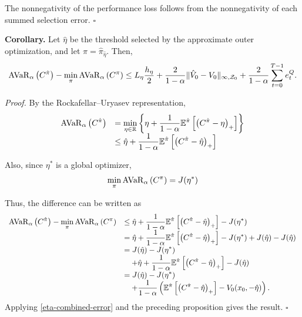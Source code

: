 The nonnegativity of the performance loss follows from the nonnegativity of each summed selection error.
\hfill$\square$

\noindent\textbf{Corollary.}
Let $\hat{\eta}$ be the threshold selected by the approximate outer optimization, and let $\hat{\pi}=\hat{\pi}_{\hat{\eta}}$.
Then,
\begin{equation}
	\operatorname{AVaR}_{\alpha} \left( C^{\hat{\pi}} \right) - \min_{\pi} \operatorname{AVaR}_{\alpha} \left( C^{\pi} \right) \leq L_{\eta}\frac{h_{\eta}}{2} + \frac{2}{1-\alpha} \| \hat{V}_0 - V_0 \|_{\infty, \mathcal{Z}_0}  + \frac{2}{1-\alpha} \sum_{t=0}^{T-1}e_t^Q.
\end{equation}

\noindent\textit{Proof.}
By the Rockafellar--Uryasev representation,
\begin{equation}
	\begin{array}{rl}
		\displaystyle \operatorname{AVaR}_{\alpha} \left( C^{\hat{\pi}} \right) &= \displaystyle \min_{\eta \in \mathbb{R}} \left\{ \eta + \frac{1}{1 - \alpha} \mathbb{E}^{\hat{\pi}} \left[ \left( C^{\hat{\pi}} - \eta \right)_+ \right] \right\} \\
		& \displaystyle \leq \hat{\eta} + \frac{1}{1-\alpha} \mathbb{E}^{\hat{\pi}} \left[ \left( C^{\hat{\pi}} - \hat{\eta} \right)_+ \right]
	\end{array}
	\notag
	\label{approx-policy-avar-bound}
\end{equation}

Also, since $\eta^*$ is a global optimizer,
\begin{equation}
	\min_{\pi} \operatorname{AVaR}_{\alpha} \left( C^{\pi} \right) = J(\eta^*)
	\notag
	\label{optimal-eta-avar}
\end{equation}

Thus, the difference can be written as
\begin{equation}
	\begin{array}{rl}
		\displaystyle \operatorname{AVaR}_{\alpha} \left( C^{\hat{\pi}} \right) - \min_{\pi} \operatorname{AVaR}_{\alpha} \left( C^{\pi} \right) & \displaystyle \leq \hat{\eta} + \frac{1}{1-\alpha} \mathbb{E}^{\hat{\pi}} \left[ \left( C^{\hat{\pi}} - \hat{\eta} \right)_+ \right] - J(\eta^*) \\
		& \displaystyle = \hat{\eta} + \frac{1}{1-\alpha} \mathbb{E}^{\hat{\pi}} \left[ \left( C^{\hat{\pi}} - \hat{\eta} \right)_+ \right] - J(\eta^*) + J(\hat{\eta}) - J(\hat{\eta}) \\
		& \displaystyle = J(\hat{\eta}) - J(\eta^*) \\
		& \displaystyle \quad + \hat{\eta} +  \frac{1}{1-\alpha} \mathbb{E}^{\hat{\pi}} \left[ \left( C^{\hat{\pi}} - \hat{\eta} \right)_+ \right] - J(\hat{\eta}) \\
		& \displaystyle = J(\hat{\eta}) - J(\eta^*) \\
		& \displaystyle \quad + \frac{1}{1 - \alpha} \left( \mathbb{E}^{\hat{\pi}}
		\left[ \left( C^{\hat{\pi}}-\hat{\eta} \right)_+ \right] - V_0(x_0,-\hat{\eta}) \right).
	\end{array}
	\notag
	\label{policy-performance-derivation}
\end{equation}
Applying \eqref{eta-combined-error} and the preceding proposition gives the result. \hfill$\square$
